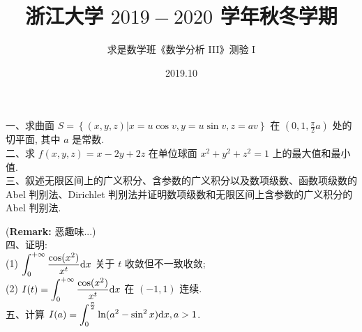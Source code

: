 \documentclass[UTF8]{ctexart}
\title{\textbf{浙江大学 $2019 - 2020$ 学年秋冬学期}}
\author{求是数学班《数学分析 III》测验 I}
\date{2019.10}
\begin{document}
\maketitle
一、求曲面 $S=\left\{(x,y,z)\left| x=u\cos v, y=u\sin v,z=av\right\}\right.$ 在 $\displaystyle\left(0,1,\frac{\pi}{2}a\right)$ 处的切平面, 其中 $a$ 是常数.
\\

二、求 $f(x,y,z)=x-2y+2z$ 在单位球面 $x^2+y^2+z^2=1$ 上的最大值和最小值.
\\

三、叙述无限区间上的广义积分、含参数的广义积分以及数项级数、函数项级数的 Abel 判别法、Dirichlet 判别法并证明数项级数和无限区间上含参数的广义积分的 Abel 判别法. 

(\textbf{Remark: }恶趣味...)
\\

四、证明:
\\

(1) $\displaystyle\int_{0}^{+\infty}\frac{\cos(x^2)}{x^t}{\rm d}x$ 关于 $t$ 收敛但不一致收敛;
\\

(2) $\displaystyle I(t)=\int_{0}^{+\infty}\frac{\cos(x^2)}{x^t}{\rm d}x$ 在 $(-1,1)$ 连续.
\\

五、计算 $\displaystyle I(a)=\int_{0}^{\frac{\pi}{2}}\ln(a^2-\sin^2x){\rm d}x,a>1$.
\end{document}
